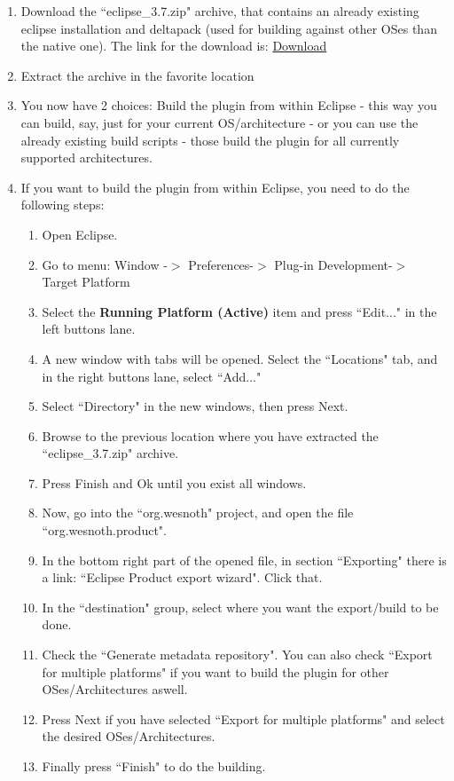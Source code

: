 \documentclass[10pt]{article}
\begin{document}
\begin{enumerate}
  \item Download the ``eclipse\_3.7.zip" archive, that contains an already existing eclipse installation and deltapack (used for building against other OSes than the native one). The link for the download is: \href{http://sourceforge.net/projects/wesnoth/files/wesnoth-umcplugin/build\_utils/eclipse\_3.7.zip/download}{Download}

  \item Extract the archive in the favorite location

  \item You now have 2 choices: Build the plugin from within Eclipse - this way you can build, say, just for your current OS/architecture - or you can use the already existing build scripts - those build the plugin for all currently supported architectures.

  \item If you want to build the plugin from within Eclipse, you need to do the following steps:
  \begin{enumerate}
    \item Open Eclipse.
    \item Go to menu: Window -$>$ Preferences-$>$ Plug-in Development-$>$ Target Platform
    \item Select the \textbf{Running Platform (Active)} item and press ``Edit..." in the left buttons lane.
    \item A new window with tabs will be opened. Select the ``Locations" tab, and in the right buttons lane, select ``Add..."
    \item Select ``Directory" in the new windows, then press Next.
    \item Browse to the previous location where you have extracted the ``eclipse\_3.7.zip" archive.
    \item Press Finish and Ok until you exist all windows.
    \item Now, go into the ``org.wesnoth" project, and open the file ``org.wesnoth.product".
    \item In the bottom right part of the opened file, in section ``Exporting" there is a link: ``Eclipse Product export wizard". Click that.
    \item In the ``destination" group, select where you want the export/build to be done.
    \item Check the ``Generate metadata repository". You can also check ``Export for multiple platforms" if you want to build the plugin for other OSes/Architectures aswell.
    \item Press Next if you have selected ``Export for multiple platforms" and select the desired OSes/Architectures.
    \item Finally press ``Finish" to do the building.
  \end{enumerate}


\end{enumerate}
\end{document}
